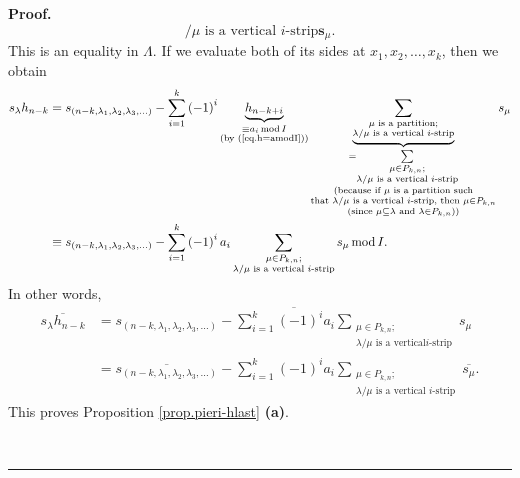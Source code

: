 \documentclass[numbers=enddot,12pt,final,onecolumn,notitlepage]{scrartcl}%
\theoremstyle{definition}
\newenvironment{proof}[1][Proof]{\noindent\textbf{#1.} }{\ \rule{0.5em}{0.5em}}
\let\sumnonlimits\sum
\renewcommand{\sum}{\sumnonlimits\limits}
\begin{document}
\begin{proof}
\[{{/\mu\text{ is a vertical }i\text{-strip}}}\mathbf{s}_{\mu}.
\]
This is an equality in $\Lambda$. If we evaluate both of its sides at
$x_{1},x_{2},\ldots,x_{k}$, then we obtain%
\begin{align*}
s_{\lambda}h_{n-k}  &  =s_{\left(  n-k,\lambda_{1},\lambda_{2},\lambda
_{3},\ldots\right)  }-\sum_{i=1}^{k}\left(  -1\right)  ^{i}%
\underbrace{h_{n-k+i}}_{\substack{\equiv a_{i}\operatorname{mod}I\\\text{(by
(\ref{eq.h=amodI}))}}}\underbrace{\sum_{\substack{\mu\text{ is a
partition;}\\\lambda/\mu\text{ is a vertical }i\text{-strip}}}}%
_{\substack{=\sum_{\substack{\mu\in P_{k,n};\\\lambda/\mu\text{ is a vertical
}i\text{-strip}}}\\\text{(because if }\mu\text{ is a partition such}%
\\\text{that }\lambda/\mu\text{ is a vertical }i\text{-strip, then }\mu\in
P_{k,n}\\\text{(since }\mu\subseteq\lambda\text{ and }\lambda\in
P_{k,n}\text{))}}}s_{\mu}\\
&  \equiv s_{\left(  n-k,\lambda_{1},\lambda_{2},\lambda_{3},\ldots\right)
}-\sum_{i=1}^{k}\left(  -1\right)  ^{i}a_{i}\sum_{\substack{\mu\in
P_{k,n};\\\lambda/\mu\text{ is a vertical }i\text{-strip}}}s_{\mu
}\operatorname{mod}I.
\end{align*}
In other words,%
\begin{align*}
\overline{s_{\lambda}h_{n-k}}  &  =\overline{s_{\left(  n-k,\lambda
_{1},\lambda_{2},\lambda_{3},\ldots\right)  }-\sum_{i=1}^{k}\left(  -1\right)
^{i}a_{i}\sum_{\substack{\mu\in P_{k,n};\\\lambda/\mu\text{ is a vertical
}i\text{-strip}}}s_{\mu}}\\
&  =\overline{s_{\left(  n-k,\lambda_{1},\lambda_{2},\lambda_{3}%
,\ldots\right)  }}-\sum_{i=1}^{k}\left(  -1\right)  ^{i}a_{i}\sum
_{\substack{\mu\in P_{k,n};\\\lambda/\mu\text{ is a vertical }i\text{-strip}%
}}\overline{s_{\mu}}.
\end{align*}
This proves Proposition \ref{prop.pieri-hlast} \textbf{(a)}.


\end{proof}
\end{document}
